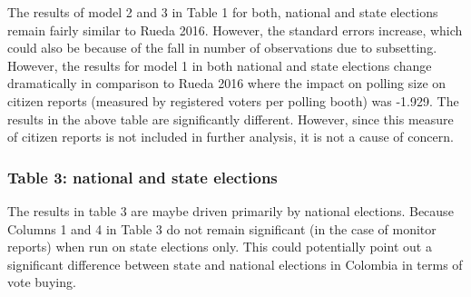 \documentclass[12pt]{article}
\begin{document}
The results of model 2 and 3 in Table 1 for both, national and state elections remain fairly similar to Rueda 2016. However, the standard errors increase, which could also be because of the fall in number of observations due to subsetting. However, the results for model 1 in both national and state elections change dramatically in comparison to Rueda 2016 where the impact on polling size on citizen reports (measured by registered voters per polling booth) was -1.929. The results in the above table are significantly different. However, since this measure of citizen reports is not included in further analysis, it is not a cause of concern. 

\subsubsection{Table 3: national and state elections}

The results in table 3 are maybe driven primarily by national elections. Because Columns 1 and 4 in Table 3 do not remain significant (in the case of monitor reports) when run on state elections only. This could potentially point out a significant difference between state and national elections in Colombia in terms of vote buying. 


\FloatBarrier
\begin{table}[]
    \caption*{Extension of Table 3 with Subsetting For National and State Elections}
 \singlespacing   
    \centering
{    
}
\end{table}
\FloatBarrier
\end{document}
